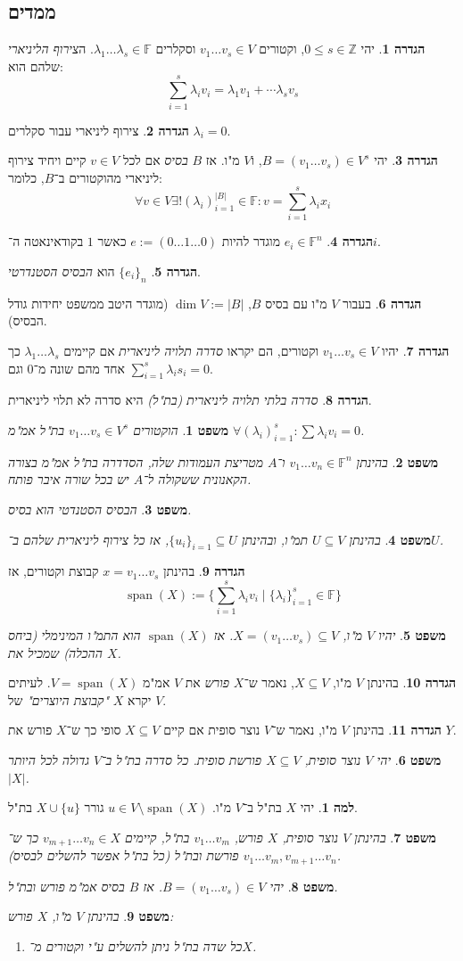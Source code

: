 \documentclass[]{article}
\newcommand\Z     {\mathbb{Z}}
\DeclareMathOperator{\Sp}     {span}
\newcommand\F         {\mathbb{F}}
\newcommand\co        {\colon}
\renewcommand\lg      {\lambda}
\newtheorem{Theorem}{משפט}
\theoremstyle{definition}
\newtheorem{definition}{הגדרה}
\newtheorem{Lemma}{למה}
\newcommand\theo  [1] {\begin{Theorem}#1\end{Theorem}}
\newcommand\defi  [1] {\begin{definition}#1\end{definition}}
\newcommand\lem   [1] {\begin{Lemma}#1\end{Lemma}}
\begin{document}
\begin{multicols}{2}
		\section{ממדים}
		\defi{יהי $0 \le s \in \Z$, וקטורים $v_1 \dots v_s \in V$ וסקלרים $\lg_1 \dots \lg_s \in \F$. ה\textit{צירוף הליניארי} שלהם הוא: 
		\[ \sum_{i = 1}^{s} \lg_iv_i = \lg_1v_1 + \cdots \lg_sv_s \]}
		\defi{צירוף ליניארי עבור סקלרים $\lg_i = 0$. }
		\defi{יהי $B = (v_1 \dots v_s) \in V^s$, ו$V$ מ"ו. אז $B$ \textit{בסיס} אם לכל $v \in V$ קיים ויחיד צירוף ליניארי מהוקטורים ב־$B$, כלומר: 
		\[ \forall v \in V \exists! (\lg_i)_{i = 1}^{|B|} \in \F \co v = \sum_{i = 1}^{s}\lg_ix_i \]}
		\defi{$e_i \in \F^n$ מוגדר להיות $e:= (0 \dots 1 \dots 0)$ כאשר $1$ בקודאינאטה ה־$i$. }
		\defi{$\{e_i\}_n$ הוא \textit{הבסיס הסטנדרטי}. }
		\defi{בעבור $V$ מ"ו עם בסיס $B$, $\dim V := |B|$ (מוגדר היטב ממשפט יחידות גודל הבסיס). }
		\defi{יהיו $v_1 \dots v_s \in V$ וקטורים, הם יקראו \textit{סדרה תלויה ליניארית} אם קיימים $\lg_1 \dots \lg_s$ כך אחד מהם שונה מ־$0$ וגם $\sum_{i = 1}^s\lg_is_i = 0$. }
		\defi{\textit{סדרה בלתי תלויה ליניארית (בת"ל)} היא סדרה לא תלוי ליניארית. }
		\theo{הוקטורים $v_1 \dots v_s \in V^s$ בת"ל אמ"מ $\forall (\lg_i)_{i = 1}^s\co \sum\lg_iv_i = 0$. }
		\theo{בהינתן $v_1 \dots v_n \in \F^n$ ו־$A$ מטריצת העמודות שלה, הסדדרה בת"ל אמ"מ בצורה הקאנונית ששקולה ל־$A$ יש בכל שורה איבר פותח.}
		\theo{הבסיס הסטנדטי הוא בסיס. }
		\theo{בהינתן $U \subseteq V$ תמ"ו, ובהינתן $\{u_i\}_{i = 1} \subseteq U$, אז כל צירוף ליניארית שלהם ב־$U$.}
		\defi{בהינתן $x = v_1 \dots v_s$ קבוצת וקטורים, אז \[\Sp(X) := \{\sum_{i = 1}^{s}\lg_iv_i \mid \{\lg_i\}^s_{i = 1} \in \F\}\]}
		\theo{יהיו $V$ מ"ו, $X = (v_1 \dots v_s) \subseteq V$. אז $\Sp(X)$ הוא התמ"ו המינימלי (ביחס ההכלה) שמכיל את $X$. }
		\defi{בהינתן $V$ מ"ו, $X \subseteq V$, נאמר ש־$X$ \textit{פורש} את $V$ אמ"מ $V = \Sp(X)$. לעיתים יקרא $X$ \textit{"קבוצת היוצרים"} של $V$. } 
		\defi{בהינתן $V$ מ"ו, נאמר ש־$V$ נוצר סופית אם קיים $X \subseteq V$ סופי כך ש־$X$ פורש את $Y$. }
		\theo{יהי $V$ נוצר סופית, $X \subseteq V$ פורשת סופית. כל סדרה בת"ל ב־$V$ גדולה לכל היותר $|X|$. }
		\lem{יהי $X$ בת"ל ב־$V$ מ"ו. $u \in V \setminus \Sp(X)$ גורר $X \cup \{u\}$ בת"ל. }
		\theo{בהינתן $V$ נוצר סופית, $X$ פורש, $v_1 \dots v_m$ בת"ל, קיימים $v_{m + 1} \dots v_n \in X$ כך ש־$v_1 \dots v_m, v_{m + 1} \dots v_n$ פורשת ובת"ל (כל בת"ל אפשר להשלים לבסיס). }
		\theo{יהי $B = (v_1 \dots v_s) \in V$. אז $B$ בסיס אמ"מ פורש ובת"ל. }
		\theo{בהינתן $V$ מ"ו, $X$ פורש:
		\begin{enumerate}
			\item כל שדה בת"ל ניתן להשלים ע"י וקטורים מ־$X$. 

\end{enumerate}}
\end{multicols}
\end{document}
